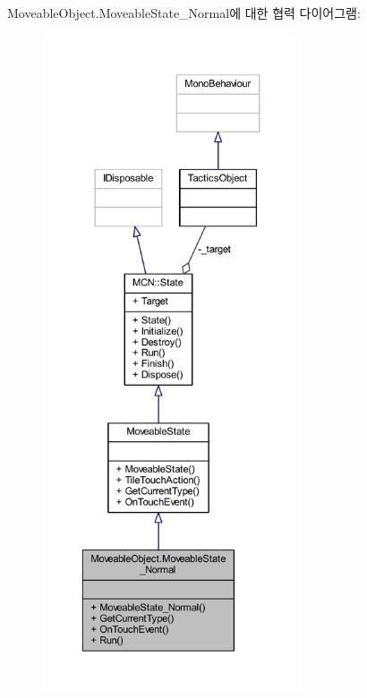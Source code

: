 Moveable\+Object.\+Moveable\+State\+\_\+\+Normal에 대한 협력 다이어그램\+:\nopagebreak
\begin{figure}[H]
\begin{center}
\leavevmode
\includegraphics[height=550pt]{class_moveable_object_1_1_moveable_state___normal__coll__graph}
\end{center}
\end{figure}
